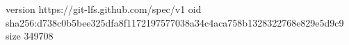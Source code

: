version https://git-lfs.github.com/spec/v1
oid sha256:d738c0b5bee325dfa8f1172197577038a34c4aca758b1328322768e829e5d9c9
size 349708
